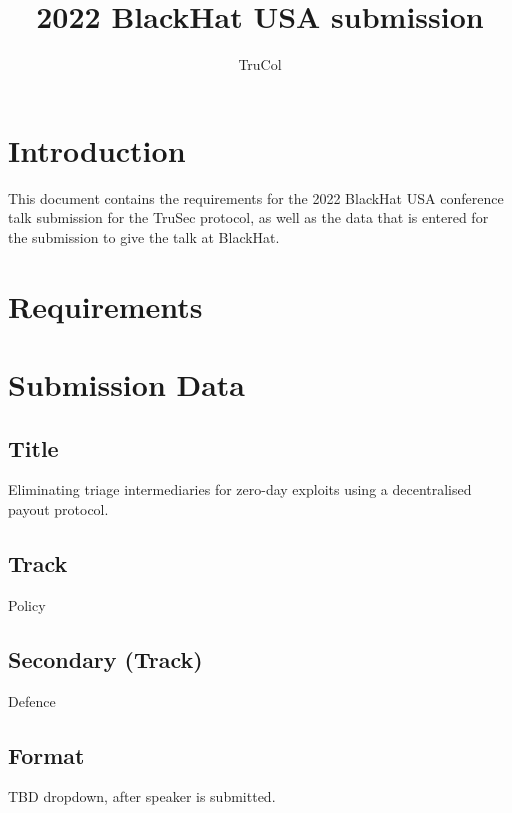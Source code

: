 \documentclass{article}
\title{2022 BlackHat USA submission}
\author{TruCol}
\begin{document}
\maketitle
\section{Introduction}
This document contains the requirements for the 2022 BlackHat USA conference talk submission for the TruSec protocol, as well as the data that is entered for the submission to give the talk at BlackHat.
\section{Requirements}
\section{Submission Data}
\subsection*{Title}
Eliminating triage intermediaries for zero-day exploits using a decentralised payout protocol.
\subsection*{Track}
Policy
\subsection*{Secondary (Track)}
Defence
\subsection*{Format}
TBD dropdown, after speaker is submitted.
\end{document}
